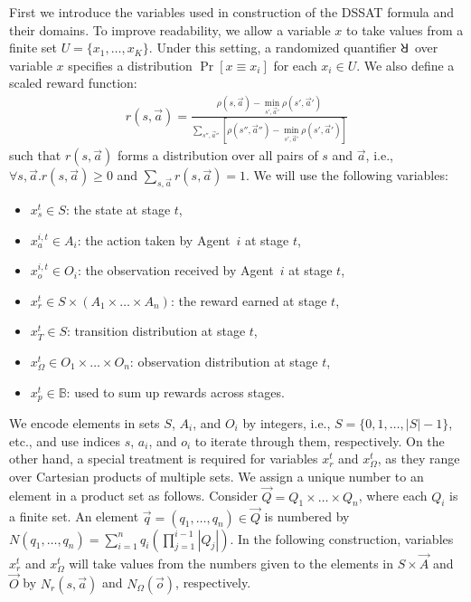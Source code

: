 First we introduce the variables used in construction of the DSSAT formula and their domains.
To improve readability, we allow a variable $x$ to take values from a finite set $U=\{x_1,\ldots,x_K\}$.
Under this setting,
a randomized quantifier $\random{}$ over variable $x$ specifies a distribution $\Pr[x\equiv x_i]$ for each $x_i\in U$.
We also define a scaled reward function:
\begin{align*}
    r(s,\vec{a})=\frac{\rho(s,\vec{a})-\min\limits_{s',\vec{a}'}\rho(s',\vec{a}')}{\sum\limits_{s'',\vec{a}''}[\rho(s'',\vec{a}'')-\min\limits_{s',\vec{a}'}\rho(s',\vec{a}')]}
\end{align*}
such that $r(s,\vec{a})$ forms a distribution over all pairs of $s$ and $\vec{a}$,
i.e., $\forall s,\vec{a}.r(s,\vec{a})\geq 0$ and $\sum\limits_{s,\vec{a}}r(s,\vec{a})=1$.
We will use the following variables:
\begin{itemize}
    \item $x_s^t\in S$: the state at stage $t$,
    \item $x_a^{i,t}\in A_i$: the action taken by Agent~$i$ at stage $t$,
    \item $x_o^{i,t}\in O_i$: the observation received by Agent~$i$ at stage $t$,
    \item $x_r^t\in S\times (A_1\times\ldots\times A_n)$: the reward earned at stage $t$,
    \item $x_T^t\in S$: transition distribution at stage $t$,
    \item $x_\Omega^t\in O_1\times\ldots\times O_n$: observation distribution at stage $t$,
    \item $x_p^t\in \mathbb{B}$: used to sum up rewards across stages.
\end{itemize}

We encode elements in sets $S$, $A_i$, and $O_i$ by integers,
i.e., $S=\{0,1,\ldots,|S|-1\}$, etc.,
and use indices $s$, $a_i$, and $o_i$ to iterate through them, respectively.
On the other hand, a special treatment is required for variables $x_r^t$ and $x_\Omega^t$,
as they range over Cartesian products of multiple sets.
We assign a unique number to an element in a product set as follows.
Consider $\vec{Q}=Q_1\times\ldots\times Q_n$, where each $Q_i$ is a finite set.
An element $\vec{q}=(q_1,\ldots,q_n)\in \vec{Q}$ is numbered by $N(q_1,\ldots,q_n)=\sum_{i=1}^n q_i(\prod_{j=1}^{i-1}|Q_j|)$.
In the following construction,
variables $x_r^t$ and $x_\Omega^t$ will take values from the numbers given to the elements in $S\times\vec{A}$ and $\vec{O}$ by $N_r(s,\vec{a})$ and $N_\Omega(\vec{o})$, respectively.


